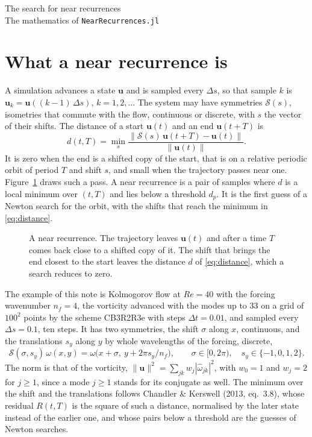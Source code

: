 \documentclass[11pt]{article}
\newcommand{\bu}{\mathbf{u}}
\newcommand{\code}[1]{\texttt{#1}}
\begin{document}
\begin{center}
{\Large The search for near recurrences}\\[3pt]
The mathematics of \code{NearRecurrences.jl}
\end{center}

\section{What a near recurrence is}
\label{sec:recurrence}

A simulation advances a state $\bu$ and is sampled every $\Delta s$, so that sample $k$ is $\bu_k = \bu((k - 1)\,\Delta s)$, $k = 1, 2, \dots$ The system may have symmetries $\mathcal{S}(s)$, isometries that commute with the flow, continuous or discrete, with $s$ the vector of their shifts. The distance of a start $\bu(t)$ and an end $\bu(t + T)$ is
\begin{equation}
d(t, T) = \min_{s} \frac{\|\mathcal{S}(s)\,\bu(t + T) - \bu(t)\|}{\|\bu(t)\|} .
\label{eq:distance}
\end{equation}
It is zero when the end is a shifted copy of the start, that is on a relative periodic orbit of period $T$ and shift $s$, and small when the trajectory passes near one. Figure~\ref{fig:recurrence} draws such a pass. A near recurrence is a pair of samples where $d$ is a local minimum over $(t, T)$ and lies below a threshold $d_p$. It is the first guess of a Newton search for the orbit, with the shifts that reach the minimum in \eqref{eq:distance}.

\begin{figure}[h]
\centering

\caption{A near recurrence. The trajectory leaves $\bu(t)$ and after a time $T$ comes back close to a shifted copy of it. The shift that brings the end closest to the start leaves the distance $d$ of \eqref{eq:distance}, which a search reduces to zero.}
\label{fig:recurrence}
\end{figure}

The example of this note is Kolmogorov flow at $Re = 40$ with the forcing wavenumber $n_f = 4$, the vorticity advanced with the modes up to 33 on a grid of $100^2$ points by the scheme CB3R2R3e with steps $\Delta t = 0.01$, and sampled every $\Delta s = 0.1$, ten steps. It has two symmetries, the shift $\sigma$ along $x$, continuous, and the translations $s_y$ along $y$ by whole wavelengths of the forcing, discrete,
\begin{equation}
\mathcal{S}(\sigma, s_y)\,\omega(x, y) = \omega\big(x + \sigma,\ y + 2\pi s_y/n_f\big), \qquad \sigma \in [0, 2\pi),\quad s_y \in \{-1, 0, 1, 2\} .
\end{equation}
The norm is that of the vorticity, $\|\bu\|^2 = \sum_{jk} w_j |\hat\omega_{jk}|^2$, with $w_0 = 1$ and $w_j = 2$ for $j \ge 1$, since a mode $j \ge 1$ stands for its conjugate as well. The minimum over the shift and the translations follows Chandler \& Kerswell (2013, eq.~3.8), whose residual $R(t, T)$ is the square of such a distance, normalised by the later state instead of the earlier one, and whose pairs below a threshold are the guesses of Newton searches.
\end{document}
